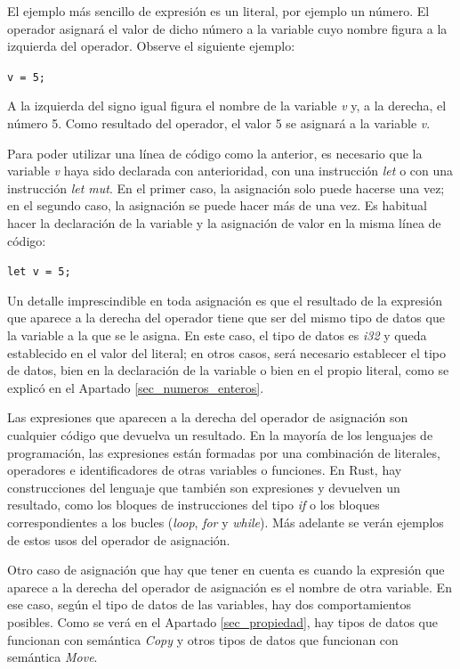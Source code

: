 El ejemplo más sencillo de expresión es un literal, por ejemplo un número. El operador asignará el valor de dicho número a la variable cuyo nombre figura a la izquierda del operador. Observe el siguiente ejemplo:

{\centering \texttt{v = 5;} \par}

A la izquierda del signo igual figura el nombre de la variable \textit{v} y, a la derecha, el número 5. Como resultado del operador, el valor 5 se asignará a la variable \textit{v}. 



Para poder utilizar una línea de código como la anterior, es necesario que la variable \textit{v} haya sido declarada con anterioridad, con una instrucción \textit{let} o con una instrucción \textit{let mut}. En el primer caso, la asignación solo puede hacerse una vez; en el segundo caso, la asignación se puede hacer más de una vez. Es habitual hacer la declaración de la variable y la asignación de valor en la misma línea de código:

{\centering \texttt{let v = 5;} \par}

Un detalle imprescindible en toda asignación es que el resultado de la expresión que aparece a la derecha del operador tiene que ser del mismo tipo de datos que la variable a la que se le asigna. En este caso, el tipo de datos es \textit{i32} y queda establecido en el valor del literal; en  otros casos, será necesario establecer el tipo de datos, bien en la declaración de la variable o bien en el propio literal, como se explicó en el Apartado \ref{sec_numeros_enteros}.

Las expresiones que aparecen a la derecha del operador de asignación son cualquier código que devuelva un resultado. En la mayoría de los lenguajes de programación, las expresiones están formadas por una combinación de literales, operadores e identificadores de otras variables o funciones. En Rust, hay construcciones del lenguaje que también son expresiones y devuelven un resultado, como los bloques de instrucciones del tipo \textit{if} o los bloques correspondientes a los bucles (\textit{loop}, \textit{for} y \textit{while}). Más adelante se verán ejemplos de estos usos del operador de asignación.

Otro caso de asignación que hay que tener en cuenta es cuando la expresión que aparece a la derecha del operador de asignación es el nombre de otra variable. En ese caso, según el tipo de datos de las variables, hay dos comportamientos posibles. Como se verá en el Apartado \ref{sec_propiedad}, hay tipos de datos que funcionan con semántica \textit{Copy} y otros tipos de datos que funcionan con semántica \textit{Move}. 

